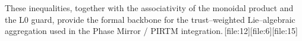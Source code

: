 \documentclass[11pt]{article}
\begin{document}
These inequalities, together with the associativity of the monoidal product
and the L0 guard, provide the formal backbone for the trust--weighted
Lie--algebraic aggregation used in the Phase Mirror / PIRTM integration.\,[file:12][file:6][file:15]


\nocite{*}
  
  
\end{document}
